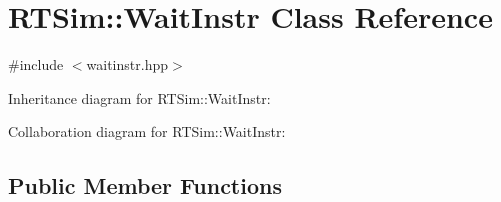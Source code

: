\hypertarget{classRTSim_1_1WaitInstr}{}\section{R\+T\+Sim\+:\+:Wait\+Instr Class Reference}
\label{classRTSim_1_1WaitInstr}


{\ttfamily \#include $<$waitinstr.\+hpp$>$}



Inheritance diagram for R\+T\+Sim\+:\+:Wait\+Instr\+:


Collaboration diagram for R\+T\+Sim\+:\+:Wait\+Instr\+:
\subsection*{Public Member Functions}
